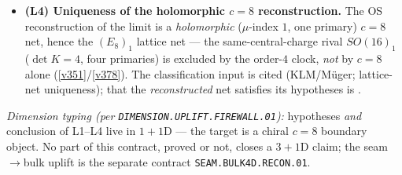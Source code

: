 \documentclass[11pt,a4paper]{article}
\newcommand{\Z}{\mathbb Z}
\begin{document}
\begin{itemize}
  $\Z_4$, \vref{v469}) commutes with the scaling limit:
  $\lim(\mathcal A_L\rtimes\mu_4)\;\cong\;(\lim\mathcal A_L)\rtimes\mu_4$. The finite Q-system
  is explicit and machine-verified (\vref{v125}/\vref{v154}); the commutation is \mO.
\item \textbf{(L4) Uniqueness of the holomorphic $c=8$ reconstruction.} The OS reconstruction of
  the limit is a \emph{holomorphic} ($\mu$-index $1$, one primary) $c=8$ net, hence the
  $(E_8)_1$ lattice net --- the same-central-charge rival $SO(16)_1$ ($\det K=4$, four
  primaries) is excluded by the order-$4$ clock, \emph{not} by $c=8$ alone
  (\vref{v351}/\vref{v378}). The classification input is cited (KLM/M\"uger; lattice-net
  uniqueness); that the \emph{reconstructed} net satisfies its hypotheses is \mO.
\end{itemize}
\emph{Dimension typing (per \texttt{DIMENSION.UPLIFT.FIREWALL.01}):} hypotheses \emph{and}
conclusion of L1--L4 live in $1{+}1$D --- the target is a chiral $c{=}8$ boundary object.  No
part of this contract, proved or not, closes a $3{+}1$D claim; the seam$\to$bulk uplift is the
separate contract \texttt{SEAM.BULK4D.RECON.01}.
\end{document}
